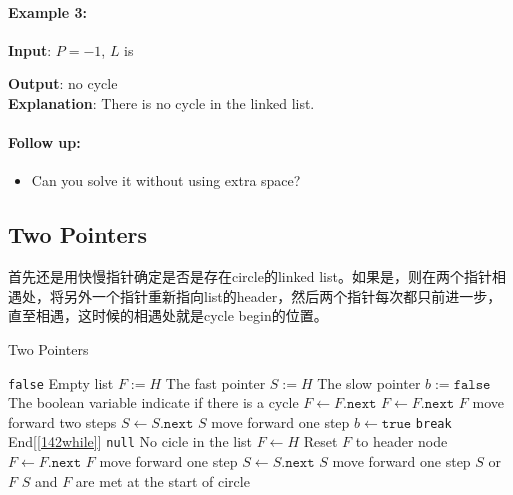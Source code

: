 \paragraph{Example 3:}
\begin{flushleft}
\textbf{Input}: $P=-1$, $L$ is
\begin{figure}[H]
\end{figure}
\textbf{Output}: no cycle
\\
\textbf{Explanation}: There is no cycle in the linked list.
\end{flushleft}
\paragraph{Follow up:}
\begin{itemize}
\item Can you solve it without using extra space?
\end{itemize}
\subsection{Two Pointers}
首先还是用快慢指针确定是否是存在circle的linked list。如果是，则在两个指针相遇处，将另外一个指针重新指向list的header，然后两个指针每次都只前进一步，直至相遇，这时候的相遇处就是cycle begin的位置。
\setcounter{algorithm}{0}
\begin{algorithm}[H]
\caption{Two Pointers}
\begin{algorithmic}[1]
\State \Return \texttt{false} \Comment Empty list
\EndIf
\State $F:=H$ \Comment The fast pointer
\State $S:=H$ \Comment The slow pointer
\State $b:=\texttt{false}$ \Comment The boolean variable indicate if there is a cycle
 \label{142while}
\State $F\gets F.\texttt{next}$
\State $F\gets F.\texttt{next}$ \Comment $F$ move forward two steps
\State $S\gets S.\texttt{next}$ \Comment $S$ move forward one step
\State $b\gets \texttt{true}$
\State \texttt{break} \Comment End[\ref{142while}]
\EndIf
\EndWhile
{}
\State \Return \texttt{null} \Comment No cicle in the list
\EndIf
\State $F\gets H$ \Comment Reset $F$ to header node
\State $F\gets F.\texttt{next}$ \Comment $F$ move forward one step
\State $S\gets S.\texttt{next}$ \Comment $S$ move forward one step
\EndWhile
\State \Return $S$ or $F$ \Comment $S$ and $F$ are met at the start of circle
\EndProcedure
\end{algorithmic}
\end{algorithm}